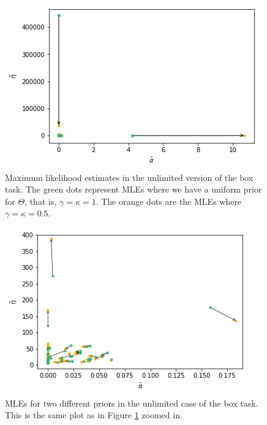 \begin{figure}
    \centering
    \includegraphics[scale=0.7]{pictures/Sensitivity/mles_unlim.png}
    \caption[MLEs for prior with $\gamma=\kappa=1$ and $\gamma=\kappa=0.5$, unlimited]{
    Maximum likelihood estimates in the unlimited version of the box task. The green dots represent MLEs where we have a uniform prior for $\Theta$, that is, $\gamma=\kappa=1$. The orange dots are the MLEs where $\gamma=\kappa=0.5$.}
    \label{fig:sensitivity_mls_unlim}
\end{figure}
\begin{figure}
    \centering
    \includegraphics[scale=0.8]{pictures/Sensitivity/mles_unlim_zoom1.png}
    \caption[Zoomed in on the MLEs in Figure \ref{fig:sensitivity_mls_unlim}]{MLEs for two different priors in the unlimited case of the box task. This is the same plot as in Figure \ref{fig:sensitivity_mls_unlim} zoomed in.}
    \label{fig:sensitivity_mls_unlim_zoom1}
\end{figure}

